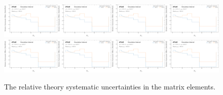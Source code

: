 \begin{figure}[h!]
\includegraphics[width=0.25\textwidth,page=17]{figures/SimResults/MultiFold_QCD_SystEffect.pdf}\includegraphics[width=0.25\textwidth,page=18]{figures/SimResults/MultiFold_QCD_SystEffect.pdf}\includegraphics[width=0.25\textwidth,page=19]{figures/SimResults/MultiFold_QCD_SystEffect.pdf}\includegraphics[width=0.25\textwidth,page=20]{figures/SimResults/MultiFold_QCD_SystEffect.pdf}\\
\includegraphics[width=0.25\textwidth,page=21]{figures/SimResults/MultiFold_QCD_SystEffect.pdf}\includegraphics[width=0.25\textwidth,page=22]{figures/SimResults/MultiFold_QCD_SystEffect.pdf}\includegraphics[width=0.25\textwidth,page=23]{figures/SimResults/MultiFold_QCD_SystEffect.pdf}\includegraphics[width=0.25\textwidth,page=24]{figures/SimResults/MultiFold_QCD_SystEffect.pdf}
\caption{The relative theory systematic uncertainties in the matrix elements.}
\label{fig:simresultsmulti_theoryQCDuncertsl}
\end{figure}